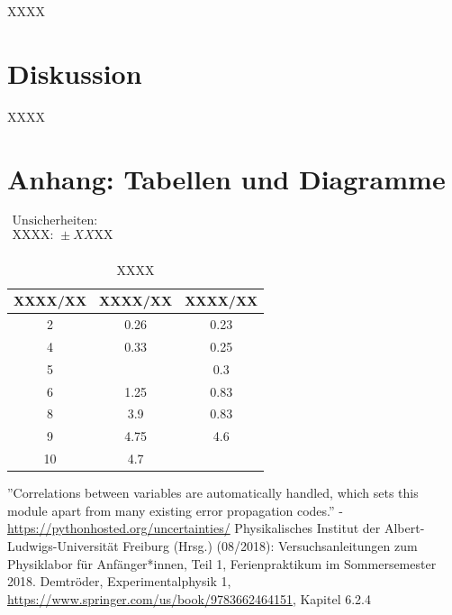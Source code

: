 \documentclass[11pt,a4paper]{article}
\begin{document}
XXXX

\section{Diskussion}

XXXX

\pagebreak

\section{Anhang: Tabellen und Diagramme}

\begin{table}[h]
\centering
\caption{XXXX} \vspace{11pt}
$\begin{array}{l}
\textrm{Unsicherheiten:}\\
\textrm{XXXX: } \pm XX \textrm{XX}\\
\end{array}$
\begin{tabular}{ccc}
\toprule
\textrm{XXXX}/\textrm{XX} & \textrm{XXXX}/\textrm{XX} & \textrm{XXXX}/\textrm{XX} \\
\midrule 
2 & 0.26 & 0.23\\
\hline
4 & 0.33 & 0.25\\
\hline 
5 & & 0.3\\
\hline 
6 & 1.25 & 0.83\\
\hline 
8 & 3.9 & 0.83\\ 
\hline
9 & 4.75 & 4.6\\ 
\hline
10 & 4.7 &\\ 
\bottomrule
\end{tabular}
\label{Tab:X}
\end{table}


\begin{thebibliography}{9}
''Correlations between variables are automatically handled, which sets this module apart from many existing error propagation codes.'' - \url{https://pythonhosted.org/uncertainties/}
 Physikalisches Institut der Albert-Ludwigs-Universität Freiburg (Hrsg.) (08/2018): Versuchsanleitungen zum Physiklabor für Anfänger*innen, Teil 1, Ferienpraktikum im Sommersemester 2018.
 Demtr\"oder, Experimentalphysik 1, \url{https://www.springer.com/us/book/9783662464151}, Kapitel 6.2.4
\end{thebibliography}
\end{document}
